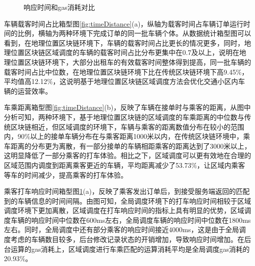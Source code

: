 \begin{figure}[h]
  \centering
  \caption{响应时间和gas消耗对比}
  \label{fig:manageGas}
\end{figure}

车辆载客时间占比箱型图\ref{fig:timeDistance}(a)，纵轴为载客时间占车辆订单运行时间的比例，横轴为两种环境下完成订单的同一批车辆个体。从数据统计箱型图可以看到，在地理位置区块链环境下，车辆的载客时间占比更长的情况更多，同时，地理位置区块链区域调度的车辆的载客时间占比分布更集中在0.7及以上，说明在地理位置区块链环境下，大部分出租车的有效载客时间整体得到提高，同一批车辆的载客时间占比中位数，在地理位置区块链环境下比在传统区块链环境下高9.45$\%$，平均值高12.12$\%$，这说明基于地理位置区块链区域调度方法会优化交通小区内车辆的运营效率。

车乘距离箱型图\ref{fig:timeDistance}(b)，反映了车辆在接单时与乘客的距离，从图中分析可知，两种环境下，基于地理位置区块链的区域调度的车乘距离的中位数与传统区块链相近，但区域调度的环境下，车辆与乘客的距离数值分布在较小的范围内，90$\%$以上的接单车辆分布在与乘客距离1000米以内，在传统区块链环境中，乘车距离的分布更为离散，有一部分接单的车辆相距乘客的距离达到了3000米以上，这明显降低了一部分乘客的打车体验。相比之下，区域调度可以更有效地在合理的区域范围内调度到距离乘客更近的车辆，平均距离减少了53.73$\%$，让区域内乘客等车的时间减少，提高乘客的打车体验。

乘客打车响应时间箱型图\ref{fig:manageGas}(a)，反映了乘客发出订单后，到接受服务端返回的匹配到的车辆信息的时间间隔。由图可知，全局调度环境下的打车响应时间相较于区域调度环境下更加离散，区域调度在打车响应时间的指标上具有明显的优势，区域调度车辆的响应时间中位数在600ms左右，全局调度车辆的响应时间中位数在1800ms左右。同时，全局调度中还有部分乘客的响应时间接近4000ms，这是由于全局调度考虑的车辆数目较多，后台修改记录状态的开销增加，导致响应时间增加。在后台运算的gas消耗上，区域调度进行车乘匹配的运算消耗平均是全局调度gas消耗的20.93$\%$。

